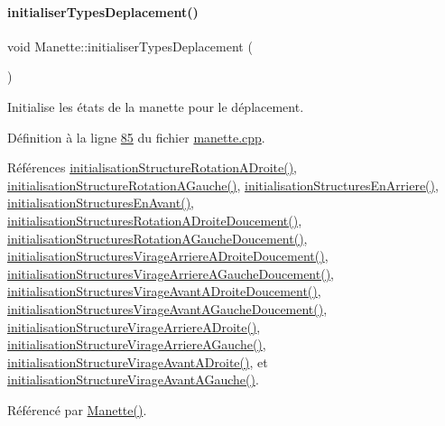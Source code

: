 \paragraph{\texorpdfstring{initialiser\+Types\+Deplacement()}{initialiserTypesDeplacement()}}
{\footnotesize\ttfamily void Manette\+::initialiser\+Types\+Deplacement (\begin{DoxyParamCaption}{ }\end{DoxyParamCaption})\hspace{0.3cm}{\ttfamily [private]}}



Initialise les états de la manette pour le déplacement. 



Définition à la ligne \hyperlink{manette_8cpp_source_l00085}{85} du fichier \hyperlink{manette_8cpp_source}{manette.\+cpp}.



Références \hyperlink{manette_8cpp_source_l00178}{initialisation\+Structure\+Rotation\+A\+Droite()}, \hyperlink{manette_8cpp_source_l00151}{initialisation\+Structure\+Rotation\+A\+Gauche()}, \hyperlink{manette_8cpp_source_l00127}{initialisation\+Structures\+En\+Arriere()}, \hyperlink{manette_8cpp_source_l00103}{initialisation\+Structures\+En\+Avant()}, \hyperlink{manette_8cpp_source_l00188}{initialisation\+Structures\+Rotation\+A\+Droite\+Doucement()}, \hyperlink{manette_8cpp_source_l00161}{initialisation\+Structures\+Rotation\+A\+Gauche\+Doucement()}, \hyperlink{manette_8cpp_source_l00296}{initialisation\+Structures\+Virage\+Arriere\+A\+Droite\+Doucement()}, \hyperlink{manette_8cpp_source_l00269}{initialisation\+Structures\+Virage\+Arriere\+A\+Gauche\+Doucement()}, \hyperlink{manette_8cpp_source_l00242}{initialisation\+Structures\+Virage\+Avant\+A\+Droite\+Doucement()}, \hyperlink{manette_8cpp_source_l00215}{initialisation\+Structures\+Virage\+Avant\+A\+Gauche\+Doucement()}, \hyperlink{manette_8cpp_source_l00286}{initialisation\+Structure\+Virage\+Arriere\+A\+Droite()}, \hyperlink{manette_8cpp_source_l00259}{initialisation\+Structure\+Virage\+Arriere\+A\+Gauche()}, \hyperlink{manette_8cpp_source_l00232}{initialisation\+Structure\+Virage\+Avant\+A\+Droite()}, et \hyperlink{manette_8cpp_source_l00205}{initialisation\+Structure\+Virage\+Avant\+A\+Gauche()}.



Référencé par \hyperlink{manette_8cpp_source_l00009}{Manette()}.


